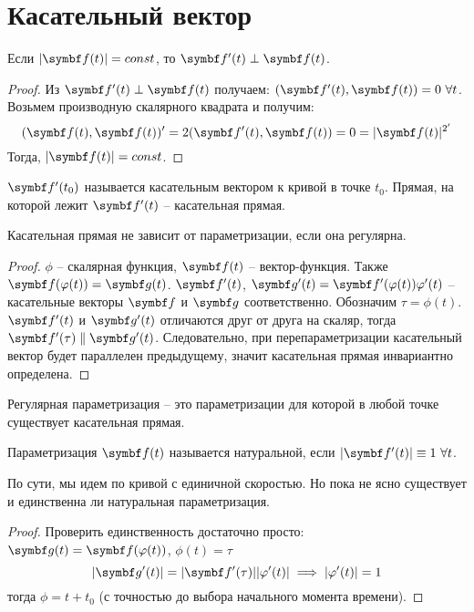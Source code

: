 \documentclass[main]{subfiles}
\begin{document}
\chapter{Касательный вектор}
\begin{lemma}\label{dfoc:very_important_lemma}
    Если $|\vf(t)| = const$, то $\vf'(t) \perp \vf(t)$.
\end{lemma}
\begin{proof}
    Из $\vf'(t) \perp \vf(t)$ получаем: $ (\vf'(t), \vf(t)) = 0\ \forall t$.
    Возьмем производную скалярного квадрата и получим:
    \[(\vf(t), \vf(t))' = 2(\vf'(t), \vf(t)) = 0 = |\vf(t)|^{2'}\]
    Тогда, $|\vf(t)| = const$.
\end{proof}
\begin{definition}
    $\vf'(t_0)$ называется касательным вектором к кривой в точке $t_0$.
    Прямая, на которой лежит $\vf'(t)$ -- касательная прямая.
\end{definition}
\begin{theorem}
    Касательная прямая не зависит от параметризации, если она регулярна.
\end{theorem}
\begin{proof}
    $\phi$ -- скалярная функция, $\vf(t)$ -- вектор-функция.
    Также $\vf(\phi(t)) = \vg(t)$.
    $\vf'(t)$, $\vg'(t) = \vf'(\phi(t)) \phi'(t)$ -- касательные векторы $\vf$ и $\vg$ соответственно.
    Обозначим $\tau = \phi(t)$.
    $\vf'(t)$ и $\vg'(t)$ отличаются друг от друга на скаляр,
    тогда $\vf'(\tau) \parallel \vg'(t)$.
    Следовательно, при перепараметризации касательный вектор будет параллелен предыдущему, значит касательная прямая инвариантно определена.
\end{proof}
\begin{remark}
    Регулярная параметризация -- это параметризации для которой в любой точке существует касательная прямая.
\end{remark}
\begin{definition}
    Параметризация $\vf(t)$ называется натуральной, если $|\vf'(t)| \equiv 1\ \forall t$.
\end{definition}
По сути, мы идем по кривой с единичной скоростью.
Но пока не ясно существует и единственна ли натуральная параметризация.
\begin{proof}
    Проверить единственность достаточно просто: $\vg(t) = \vf(\phi(t))$, $\phi(t) = \tau$
    \[|\vg'(t)| = |\vf'(\tau)| |\phi'(t)| \implies |\phi'(t)| = 1\]
    тогда $\phi = t + t_0$ (с точностью до выбора начального момента времени).
\end{proof}
\end{document}
